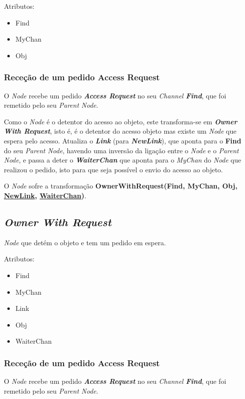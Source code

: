Atributos:
\begin{itemize}
    \item Find
    \item MyChan
    \item Obj
\end{itemize}


\subsubsection*{Receção de um pedido Access Request}
O \emph{Node} recebe um pedido \emph{\textbf{Access Request}} no seu \emph{Channel \textbf{Find}},
que foi remetido pelo seu \emph{Parent Node}. 


Como o \emph{Node} é o detentor do acesso ao objeto, este transforma-se em \emph{\textbf{Owner With Request}},
isto é, é o detentor do acesso objeto mas existe um \emph{Node} que espera pelo acesso.
Atualiza o \textbf{\emph{Link}} (para \textbf{\emph{NewLink}}),
que aponta para o \textbf{Find} do seu \emph{Parent Node}, havendo uma inversão da ligação entre o \emph{Node} e o \emph{Parent Node},
e passa a deter o \textbf{\emph{WaiterChan}} que aponta para o \emph{MyChan} do \emph{Node} que realizou o pedido, isto para
que seja possível o envio do acesso ao objeto.


O \emph{Node} sofre a transformação \textbf{OwnerWithRequest(Find, MyChan, Obj, \underline{NewLink}, \underline{WaiterChan})}.



\subsection{\emph{Owner With Request}}
\label{especificacao:nodes:owner_with_request}

\emph{Node} que detém o objeto e tem um pedido em espera.

Atributos:
\begin{itemize}
    \item Find
    \item MyChan
    \item Link
    \item Obj
    \item WaiterChan
\end{itemize}

\subsubsection*{Receção de um pedido Access Request}
O \emph{Node} recebe um pedido \emph{\textbf{Access Request}} no seu \emph{Channel \textbf{Find}},
que foi remetido pelo seu \emph{Parent Node}.


